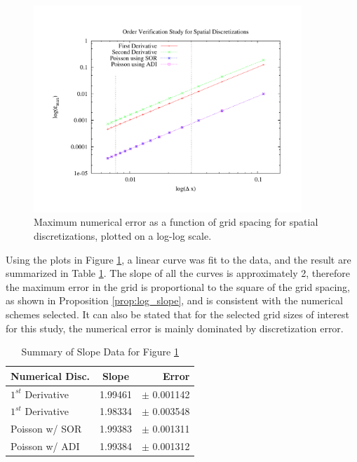 \begin{figure}[h!]
\center
\includegraphics[width=0.9\textwidth]{plots/ovs_sd}
\caption{Maximum numerical error as a function of grid spacing for spatial discretizations, plotted on a log-log scale.}
\label{fig:ovs_sd}
\end{figure}

Using the plots in Figure \ref{fig:ovs_sd}, a linear curve was fit to the data, and the result are summarized in Table \ref{tab:ovs_sd}.  The slope of all the curves is approximately 2, therefore the maximum error in the grid is proportional to the square of the grid spacing, as shown in Proposition \ref{prop:log_slope}, and is consistent with the numerical schemes selected.  It can also be stated that for the selected grid sizes of interest for this study, the numerical error is mainly dominated by discretization error.


\begin{table}
\center
\caption{Summary of Slope Data for Figure \ref{fig:ovs_sd}}
\label{tab:ovs_sd}

\begin{tabular}{l c r}
\hline
Numerical Disc. & Slope & Error \\
\hline 
\hline 
$1^{st}$ Derivative & 1.99461 & $\pm$ 0.001142 \\
$1^{st}$ Derivative & 1.98334 & $\pm$ 0.003548 \\
Poisson w/ SOR      & 1.99383 & $\pm$ 0.001311 \\
Poisson w/ ADI      & 1.99384 & $\pm$ 0.001312 \\
\hline  
\end{tabular}
\end{table}



